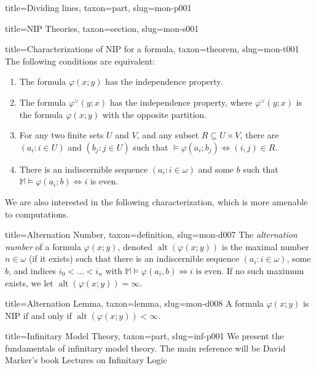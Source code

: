 \documentclass[a4paper]{article}
\begin{document}
\begin{tree}{title={Dividing lines}, taxon={part}, slug={mon-p001}}
\begin{tree}{title={NIP Theories}, taxon={section}, slug={mon-s001}}
\begin{tree}{title={Characterizations of NIP for a formula}, taxon={theorem}, slug={mon-t001}}
The following conditions are equivalent:
\begin{enumerate}
\item{ The formula \(\varphi (x;y)\) has the independence property.}
  \item{ The formula \(\varphi ^{ \vee }(y;x)\) has the independence property,
	where \(\varphi ^{ \vee }(y;x)\) is the formula \(\varphi (x;y)\) with the
	opposite partition.}
	\item{ For any two finite sets \(U\) and \(V\), and any subset \(R  \subseteq  U  \times  V\), there are \((a_i : i  \in  U)\) and \((b_j : j  \in  U)\) such that \(\mathbb   \models   \varphi (a_i;b_j)  \Longleftrightarrow  (i,j)  \in  R\).}
	\item{ There is an indiscernible sequence \((a_i : i  \in   \omega )\)
	and some \(b\) such that \(\mathbb  M  \models   \varphi (a_i;b)  \Longleftrightarrow  i\)
	is even.}
\end{enumerate}\par{We are also interested in the following characterization, which is more amenable to computations.}
\begin{tree}{title={Alternation Number}, taxon={definition}, slug={mon-d007}}
The \emph{alternation number} of a formula \(\varphi (x;y)\), denoted \(\operatorname {alt}( \varphi (x;y))\) is the maximal number \(n  \in   \omega\) (if it exists) such that there is an indiscernible sequence \((a_i : i  \in   \omega )\), some \(b\), and indices \(i_0 <  \dots  < i_n\) with \(\mathbb  M  \models   \varphi (a_i,b)  \Longleftrightarrow  i  \text { is even}\). If no such maximum exists, we let \(\operatorname {alt}( \varphi (x;y)) =  \infty\).
\end{tree}

\begin{tree}{title={Alternation Lemma}, taxon={lemma}, slug={mon-d008}}
A formula \(\varphi (x;y)\) is NIP if and only if \(\operatorname {alt}( \varphi (x;y)) <  \infty\).
\end{tree}

\end{tree}

\end{tree}


\end{tree}


  
  
\begin{tree}{title={Infinitary Model Theory}, taxon={part}, slug={inf-p001}}
We present the fundamentals of infinitary model theory. The main reference will be David Marker's book Lectures on Infinitary Logic
\end{tree}
\end{document}
